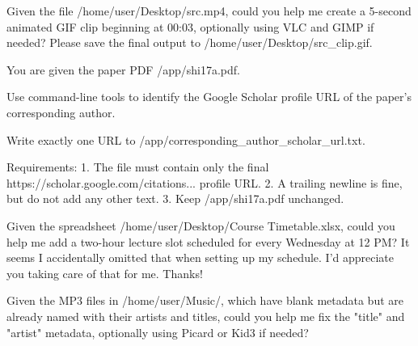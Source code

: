 \begin{instructionbox}
Given the file \textasciigrave{}/home/user/Desktop/src.mp4\textasciigrave{}, could you help me create a 5-second animated GIF clip beginning at 00:03, optionally using VLC and GIMP if needed? Please save the final output to \textasciigrave{}/home/user/Desktop/src\_clip.gif\textasciigrave{}.
\end{instructionbox}

\begin{instructionbox}
You are given the paper PDF \textasciigrave{}/app/shi17a.pdf\textasciigrave{}.

Use command-line tools to identify the Google Scholar profile URL of the paper's corresponding author.

Write exactly one URL to \textasciigrave{}/app/corresponding\_author\_scholar\_url.txt\textasciigrave{}.

Requirements:
1. The file must contain only the final \textasciigrave{}https://scholar.google.com/citations...\textasciigrave{} profile URL.
2. A trailing newline is fine, but do not add any other text.
3. Keep \textasciigrave{}/app/shi17a.pdf\textasciigrave{} unchanged.
\end{instructionbox}

\begin{instructionbox}
Given the spreadsheet \textasciigrave{}/home/user/Desktop/Course Timetable.xlsx\textasciigrave{}, could you help me add a two-hour lecture slot scheduled for every Wednesday at 12 PM? It seems I accidentally omitted that when setting up my schedule. I'd appreciate you taking care of that for me. Thanks!
\end{instructionbox}

\begin{instructionbox}
Given the MP3 files in \textasciigrave{}/home/user/Music/\textasciigrave{}, which have blank metadata but are already named with their artists and titles, could you help me fix the "title" and "artist" metadata, optionally using Picard or Kid3 if needed?
\end{instructionbox}

